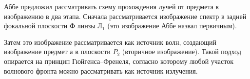 \documentclass[a5paper,10pt, twoside]{article} %
\begin{document}
		Аббе предложил рассматривать схему прохождения лучей от предмета к изображению в два этапа. Сначала рассматривается изображение спектр в задней фокальной плоскости Ф линзы $Л_1$ (это изображение Аббе назвал первичным).
		
		Затем это изображение рассматривается как источник волн, создающий изображение предмет	а в плоскости $P_2$ (вторичное изображение). Такой подход опирается на принцип Гюйгенса–Френеля, согласно которому любой участок волнового фронта можно рассматривать как источник излучения.
		
		\begin{figure}[h]
			\begin{minipage}[h]{0.65\linewidth}
			\end{minipage}
			\vfill
			\begin{minipage}[h]{0.65\linewidth}
			\end{minipage}
	        \vfill
		    \begin{minipage}[h]{0.65\linewidth}

\end{minipage}
\end{figure}
\end{document}
